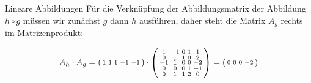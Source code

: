 \begin{example2}[breakable]{Lineare Abbildungen}
Für die Verknüpfung der Abbildungsmatrix der Abbildung $h \circ g$ müssen wir zunächst $g$ dann $h$ ausführen, daher steht die Matrix $A_{g}$ rechts im Matrizenprodukt:

$$
A_h \cdot A_g = \begin{psmallmatrix}
    1 & 1 & 1 & -1 & -1
\end{psmallmatrix} \cdot \begin{psmallmatrix}
    1 & -1 & 0 & 1 & 1 \\
    0 & 1 & 1 & 0 & 2 \\
    -1 & 1 & 0 & 0 & -2 \\
    0 & 0 & 0 & 1 & -1 \\
    0 & 1 & 1 & 2 & 0
\end{psmallmatrix} = \begin{psmallmatrix}
    0 & 0 & 0 & -2
\end{psmallmatrix}
$$

\end{example2}

